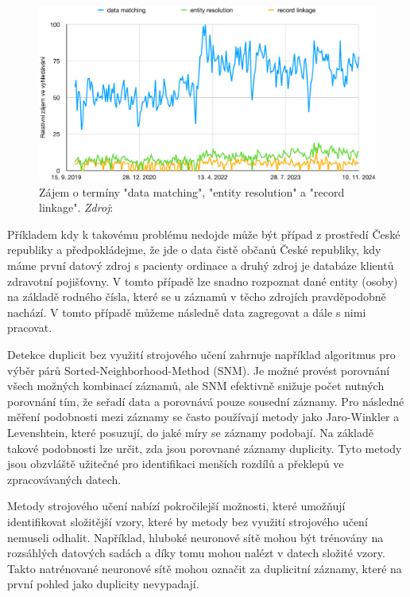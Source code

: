 \begin{figure}[htb]
    \centering
    \includegraphics[scale=0.6]{images/google-trends.pdf}
    \caption{Zájem o termíny "data matching", "entity resolution" a "record linkage".\newline
             \textit{Zdroj}: \cite{google_trends_google_2024}}
    \label{fig:google-trends}
\end{figure}
\pagebreak

Příkladem kdy k takovému problému nedojde může být případ z prostředí České republiky a předpokládejme, že jde o data čistě občanů České republiky, kdy máme první datový zdroj s pacienty ordinace a druhý zdroj je databáze klientů zdravotní pojišťovny. V tomto případě lze snadno rozpoznat dané entity (osoby) na základě rodného čísla, které se u záznamů v těcho zdrojích pravděpodobně nachází. V tomto případě můžeme následně data zagregovat a dále s nimi pracovat.

Detekce duplicit bez využití strojového učení zahrnuje například algoritmus pro výběr párů Sorted-Neighborhood-Method (SNM). Je možné provést porovnání všech možných kombinací záznamů, ale SNM efektivně snižuje počet nutných porovnání tím, že seřadí data a porovnává pouze sousední záznamy. Pro následné měření podobnosti mezi záznamy se často používají metody jako Jaro-Winkler a Levenshtein, které posuzují, do jaké míry se záznamy podobají. Na základě takové podobnosti lze určit, zda jsou porovnané záznamy duplicity. Tyto metody jsou obzvláště užitečné pro identifikaci menších rozdílů a překlepů ve zpracovávaných datech. \cite{draisbach_choosing_2013}

Metody strojového učení nabízí pokročilejší možnosti, které umožňují identifikovat složitější vzory, které by metody bez využití strojového učení nemuseli odhalit. Například, hluboké neuronové sítě mohou být trénovány na rozsáhlých datových sadách a díky tomu mohou nalézt v datech složité vzory. Takto natrénované neuronové sítě mohou označit za duplicitní záznamy, které na první pohled jako duplicity nevypadají. \cite{pasek_mqdd_2022}

